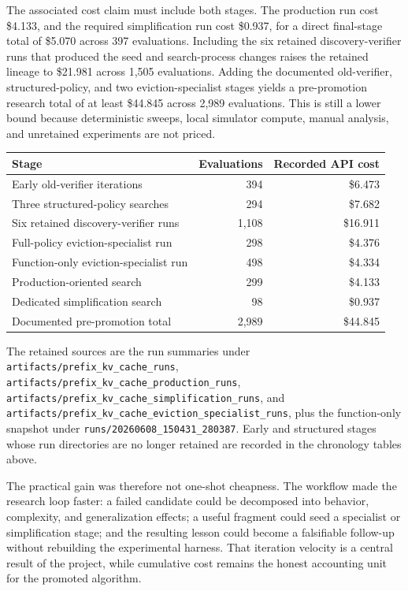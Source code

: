 \documentclass[11pt]{article}
\newcommand{\filepath}[1]{\nolinkurl{#1}}
\begin{document}
The associated cost claim must include both stages.  The production run cost
\$4.133, and the required simplification run cost \$0.937, for a direct final-stage
total of \$5.070 across 397 evaluations.  Including the six retained
discovery-verifier runs that produced the seed and search-process changes raises the
retained lineage to \$21.981 across 1,505 evaluations.  Adding the documented
old-verifier, structured-policy, and two eviction-specialist stages yields a
pre-promotion research total of at least \$44.845 across 2,989 evaluations.  This is
still a lower bound because deterministic sweeps, local simulator compute, manual
analysis, and unretained experiments are not priced.

\begin{center}
\small
\begin{tabular}{lrr}
\toprule
\textbf{Stage} & \textbf{Evaluations} & \textbf{Recorded API cost} \\
\midrule
Early old-verifier iterations & 394 & \$6.473 \\
Three structured-policy searches & 294 & \$7.682 \\
Six retained discovery-verifier runs & 1,108 & \$16.911 \\
Full-policy eviction-specialist run & 298 & \$4.376 \\
Function-only eviction-specialist run & 498 & \$4.334 \\
Production-oriented search & 299 & \$4.133 \\
Dedicated simplification search & 98 & \$0.937 \\
\midrule
Documented pre-promotion total & 2,989 & \$44.845 \\
\bottomrule
\end{tabular}
\end{center}

The retained sources are the run summaries under
\filepath{artifacts/prefix_kv_cache_runs},
\filepath{artifacts/prefix_kv_cache_production_runs},
\filepath{artifacts/prefix_kv_cache_simplification_runs}, and
\filepath{artifacts/prefix_kv_cache_eviction_specialist_runs}, plus the function-only
snapshot under \filepath{runs/20260608_150431_280387}.  Early and structured stages
whose run directories are no longer retained are recorded in the chronology tables
above.

The practical gain was therefore not one-shot cheapness.  The workflow made the
research loop faster: a failed candidate could be decomposed into behavior,
complexity, and generalization effects; a useful fragment could seed a specialist or
simplification stage; and the resulting lesson could become a falsifiable follow-up
without rebuilding the experimental harness.  That iteration velocity is a central
result of the project, while cumulative cost remains the honest accounting unit for
the promoted algorithm.
\end{document}
